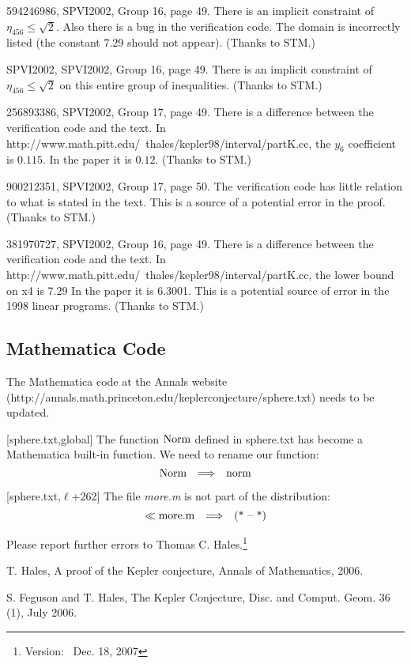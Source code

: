 \documentclass[11pt]{amsart}
\def\ver{~Dec. 18, 2007}
\def\op#1{{\text{#1}}}
\def\to{{\quad\Longrightarrow\quad}}
\def\line{$\ell$}
\def\text{\hbox}
\begin{document}
594246986, SPVI2002, Group 16, page 49.  There is an implicit constraint of $\eta_{456}\le \sqrt2$.  Also there is a bug in the verification code.  The domain is incorrectly listed (the constant $7.29$ should not appear).  (Thanks to STM.)

SPVI2002, SPVI2002, Group 16, page 49.  There is an implicit constraint of $\eta_{456}\le\sqrt2$ on this entire group of inequalities.
(Thanks to STM.)

256893386, SPVI2002, Group 17, page 49.  There is a difference between the verification code and the text.  In http://www.math.pitt.edu/~thales/kepler98/interval/partK.cc, the $y_6$ coefficient is $0.115$.  In the paper it is $0.12$.
(Thanks to STM.)

900212351, SPVI2002, Group 17, page 50.  The verification code has little relation to what is stated in the text.  This is a source of a potential error in the proof. (Thanks to STM.)

381970727, SPVI2002, Group 16, page 49.   There is a difference between the verification code and the text.  In http://www.math.pitt.edu/~thales/kepler98/interval/partK.cc, the lower bound on x4 is 7.29  In the paper it is 6.3001.  This is a potential source of error in the 1998 linear programs.  (Thanks to STM.)

\subsection{Mathematica Code}

The Mathematica code at the Annals website
(http://annals.math.princeton.edu/keplerconjecture/sphere.txt) needs to be updated.

[sphere.txt,global]
The function $\op{Norm}$ defined in sphere.txt
has become a Mathematica built-in function.
We need to rename our function: 
	$$\op{Norm} \to \op{norm}$$
	
[sphere.txt,\line+262]
The file {\it more.m} is not part of the distribution:
	$$\ll \op{more.m} \to \op{(* -- *)}$$



Please report further errors to
Thomas C. Hales.\footnote{Version: \ver}


\begin{thebibliography}{}

 {T. Hales}, A proof of the Kepler
	conjecture, Annals of Mathematics,
	2006.
	
 {S. Feguson and T. Hales},
	The Kepler Conjecture, Disc. and Comput.
	Geom. 36 (1), July 2006.


\end{thebibliography}
\end{document}
